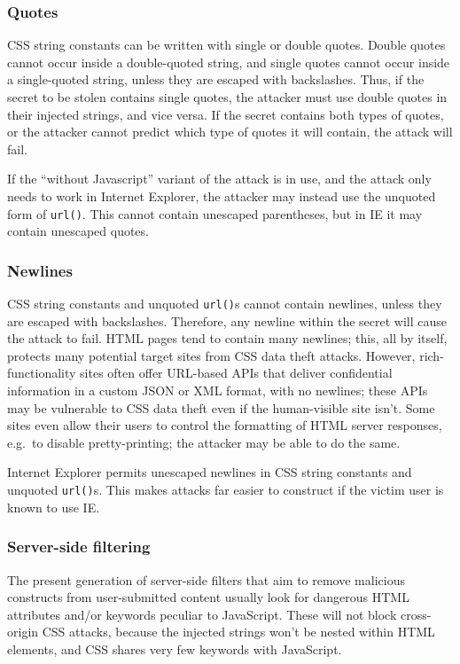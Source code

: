 \documentclass{acm_proc_article-sp}
\begin{document}
\subsubsection{Quotes}
CSS string constants can be written with single or double quotes.
Double quotes cannot occur inside a double-quoted string, and single
quotes cannot occur inside a single-quoted string, unless they are
escaped with backslashes.  Thus, if the secret to be stolen contains
single quotes, the attacker must use double quotes in their injected
strings, and vice versa.  If the secret contains both types of quotes,
or the attacker cannot predict which type of quotes it will contain,
the attack will fail.

If the “without Javascript” variant of the attack is in use, and the
attack only needs to work in Internet Explorer, the attacker may
instead use the unquoted form of \texttt{url()}.  This cannot contain
unescaped parentheses, but in IE it may contain unescaped quotes.

\subsubsection{Newlines}
CSS string constants and unquoted \texttt{url()}s cannot contain
newlines, unless they are escaped with backslashes.  Therefore, any
newline within the secret will cause the attack to fail.  HTML pages
tend to contain many newlines; this, all by itself, protects many
potential target sites from CSS data theft attacks.  However,
rich-functionality sites often offer URL-based APIs that deliver
confidential information in a custom JSON or XML format, with no
newlines; these APIs may be vulnerable to CSS data theft even if the
human-visible site isn't.  Some sites even allow their users to
control the formatting of HTML server responses, e.g.\ to disable
pretty-printing; the attacker may be able to do the same.

Internet Explorer permits unescaped newlines in CSS string constants
and unquoted \texttt{url()}s.  This makes attacks far easier to
construct if the victim user is known to use IE.

\subsubsection{Server-side filtering} \label{sec:escapes}
The present generation of server-side filters that aim to remove
malicious constructs from user-submitted content usually look for
dangerous HTML attributes and/or keywords peculiar to JavaScript.
These will not block cross-origin CSS attacks, because the injected
strings won't be nested within HTML elements, and CSS shares very few
keywords with JavaScript.
\end{document}
